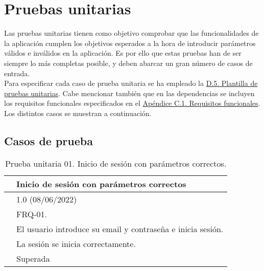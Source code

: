 \section{Pruebas unitarias}

Las pruebas unitarias \cite{pruebaunitaria} tienen como objetivo comprobar que las funcionalidades de la aplicación cumplen los objetivos esperados a la hora de introducir parámetros válidos e inválidos en la aplicación. Es por ello que estas pruebas han de ser siempre lo más completas posible, y deben abarcar un gran número de casos de entrada.
\\

Para especificar cada caso de prueba unitaria se ha empleado la \hyperref[enlacePUX]{D.5. Plantilla de pruebas unitarias}. Cabe mencionar también que en las dependencias se incluyen los requisitos funcionales especificados en el \hyperref[APRequisitosFuncionales]{Apéndice C.1. Requisitos funcionales}. Los distintos casos se muestran a continuación.

\subsection{Casos de prueba}

\begin{table}[H]
\begin{center}
\begin{tabular}{|p{3cm}|p{10cm}|} \hline
\centering {\bf PU-01} & Inicio de sesión con parámetros correctos  \\ \hline\hline
\centering {\bf Versión} & 1.0 (08/06/2022) \\ \hline
\centering {\bf Dependencias} &  FRQ-01. \\ \hline
\centering {\bf Descripción} &  El usuario introduce su email y contraseña e inicia sesión. \\ \hline
\centering {\bf Criterio de aceptación} & La sesión se inicia correctamente. \\ \hline
\centering {\bf Estado} & Superada \\ \hline
\end{tabular}
\caption{Prueba unitaria 01. Inicio de sesión con parámetros correctos.}
\label{enlacePU1}
\end{center}
\end{table}

